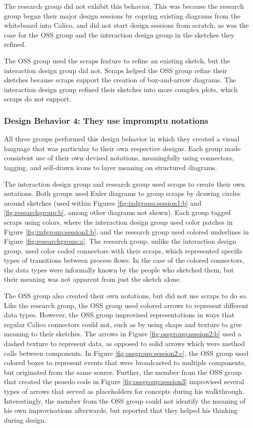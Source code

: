 \documentclass[12pt,fleqn]{ucithesis}
\begin{document}
The research group did not exhibit this behavior. This was because the research group began their major design sessions by copying existing diagrams from the whiteboard into Calico, and did not start design sessions from scratch, as was the case for the OSS group and the interaction design group in the sketches they refined.

The OSS group used the scraps feature to refine an existing sketch, but the interaction design group did not. Scraps helped the OSS group refine their sketches because scraps support the creation of box-and-arrow diagrams. The interaction design group refined their sketches into more complex plots, which scraps do not support.

\subsubsection{Design Behavior 4: They use impromptu notations}

All three groups performed this design behavior in which they created a visual language that was particular to their own respective designs. Each group made consistent use of their own devised notations, meaningfully using connectors, tagging, and self-drawn icons to layer meaning on structured diagrams.

The interaction design group and research group used scraps to create their own notations. Both groups used Euler diagrams to group scraps by drawing circles around sketches (used within Figures \ref{fig:ixdgroup:session1:b} and \ref{fig:researchgroup:b}, among other diagrams not shown). Each group tagged scraps using colors, where the interaction design group used color patches in Figure \ref{fig:ixdgroup:session1:b}, and the research group used colored underlines in Figure \ref{fig:researchgroup:a}. The research group, unlike the interaction design group, used color coded connectors with their scraps, which represented specific types of transitions between process flows. In the case of the colored connectors, the data types were informally known by the people who sketched them, but their meaning was not apparent from just the sketch alone. 

The OSS group also created their own notations, but did not use scraps to do so. Like the research group, the OSS group used colored arrows to represent different data types. However, the OSS group improvised representations in ways that regular Calico connectors could not, such as by using shape and texture to give meaning to their sketches. The arrows in Figure \ref{fig:ossgroup:session2:b} used a dashed texture to represent data, as opposed to solid arrows which were method calls between components. In Figure \ref{fig:ossgroup:session2:c}, the OSS group used colored boxes to represent events that were broadcasted to multiple components, but originated from the same source. Further, the member from the OSS group that created the psuedo code in Figure \ref{fig:ossgroup:session3} improvised several types of arrows that served as placeholders for concepts during his walkthrough. Interestingly, the member from the OSS group could not identify the meaning of his own improvisations afterwards, but reported that they helped his thinking during design.
\end{document}
